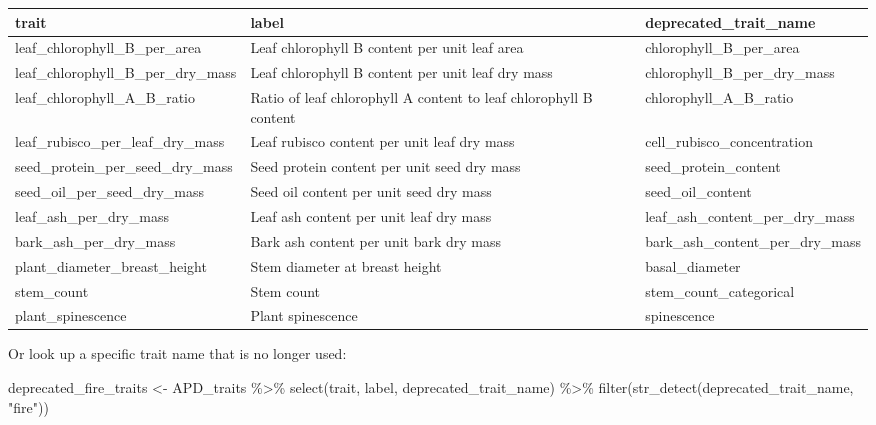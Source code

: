 \documentclass[
  letterpaper,
  DIV=11,
  numbers=noendperiod]{scrartcl}
\newenvironment{Shaded}{\begin{snugshade}}{\end{snugshade}}
\newcommand{\FunctionTok}[1]{\textcolor[rgb]{0.28,0.35,0.67}{#1}}
\newcommand{\NormalTok}[1]{\textcolor[rgb]{0.00,0.23,0.31}{#1}}
\newcommand{\OtherTok}[1]{\textcolor[rgb]{0.00,0.23,0.31}{#1}}
\newcommand{\SpecialCharTok}[1]{\textcolor[rgb]{0.37,0.37,0.37}{#1}}
\newcommand{\StringTok}[1]{\textcolor[rgb]{0.13,0.47,0.30}{#1}}
\begin{document}
\begin{tabular}{>{\raggedright\arraybackslash}p{6cm}>{\raggedright\arraybackslash}p{4cm}>{\raggedright\arraybackslash}p{6cm}}
\toprule
trait & label & deprecated\_trait\_name\\
\midrule
leaf\_chlorophyll\_B\_per\_area & Leaf chlorophyll B content per unit leaf area & chlorophyll\_B\_per\_area\\
leaf\_chlorophyll\_B\_per\_dry\_mass & Leaf chlorophyll B content per unit leaf dry mass & chlorophyll\_B\_per\_dry\_mass\\
leaf\_chlorophyll\_A\_B\_ratio & Ratio of leaf chlorophyll A content to leaf chlorophyll B content & chlorophyll\_A\_B\_ratio\\
leaf\_rubisco\_per\_leaf\_dry\_mass & Leaf rubisco content per unit leaf dry mass & cell\_rubisco\_concentration\\
seed\_protein\_per\_seed\_dry\_mass & Seed protein content per unit seed dry mass & seed\_protein\_content\\
\addlinespace
seed\_oil\_per\_seed\_dry\_mass & Seed oil content per unit seed dry mass & seed\_oil\_content\\
leaf\_ash\_per\_dry\_mass & Leaf ash content per unit leaf dry mass & leaf\_ash\_content\_per\_dry\_mass\\
bark\_ash\_per\_dry\_mass & Bark ash content per unit bark dry mass & bark\_ash\_content\_per\_dry\_mass\\
plant\_diameter\_breast\_height & Stem diameter at breast height & basal\_diameter\\
stem\_count & Stem count & stem\_count\_categorical\\
\addlinespace
plant\_spinescence & Plant spinescence & spinescence\\
\bottomrule
\end{tabular}

\pagebreak

Or look up a specific trait name that is no longer used:

\begin{Shaded}
\begin{Highlighting}[]
\NormalTok{deprecated\_fire\_traits }\OtherTok{\textless{}{-}} 
\NormalTok{  APD\_traits }\SpecialCharTok{\%\textgreater{}\%}
  \FunctionTok{select}\NormalTok{(trait, label, deprecated\_trait\_name) }\SpecialCharTok{\%\textgreater{}\%}
  \FunctionTok{filter}\NormalTok{(}\FunctionTok{str\_detect}\NormalTok{(deprecated\_trait\_name, }\StringTok{"fire"}\NormalTok{))}
\end{Highlighting}
\end{Shaded}
\end{document}
